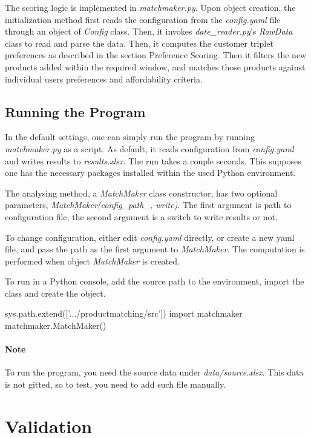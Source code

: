 \documentclass{report}
\begin{document}
The scoring logic is implemented in \emph{matchmaker.py}. Upon object creation, the initialization method first reads the
configuration from the \emph{config.yaml} file through an object of \emph{Config} class. Then, it invokes \emph{date\_reader.py}'s 
\emph{RawData} class to read and parse the data. Then, it computes the customer triplet preferences as described in the section 
Preference Scoring. Then it filters the new products added within the required window, and matches those products against 
individual users preferences and affordability criteria.

\subsection*{Running the Program}

In the default settings, one can simply run the program by running \emph{matchmaker.py} as a script. As default, it reads
configuration from \emph{config.yaml} and writes results to \emph{results.xlsx}. The run takes a couple seconds. This supposes
one has the necessary packages installed within the used Python environment.

The analysing method, a \emph{MatchMaker} class constructor, has two optional parameters, \emph{MatchMaker(config\_path\_, write)}. 
The first argument is path to configuration file, the second argument is a switch to write results or not.

To change configuration, either edit \emph{config.yaml} directly, or create a new yaml file, and pass the path as the first argument 
to \emph{MatchMaker}. The computation is performed when object \emph{MatchMaker} is created.

To run in a Python console, add the source path to the environment, import the class and create the object.

\begin{verbatim*}
sys.path.extend(['.../productmatching/src']) 
import matchmaker
matchmaker.MatchMaker()
\end{verbatim*}

\paragraph{Note} To run the program, you need the source data under \emph{data/source.xlsx}. This data is not gitted, so
to test, you need to add such file manually.

\section*{Validation}
\end{document}
